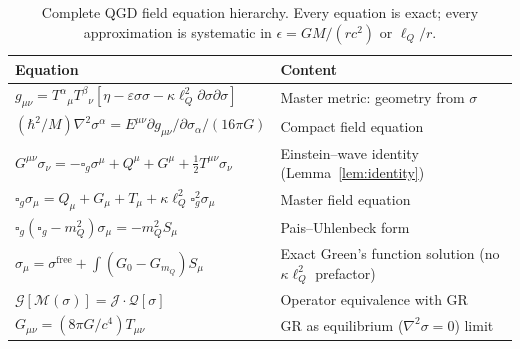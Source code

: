 \documentclass[11pt,a4paper]{article}
\theoremstyle{plain}
\theoremstyle{definition}
\theoremstyle{remark}
\newcommand{\lQ}{\ell_Q}
\newcommand{\mQ}{m_Q}
\newcommand{\boxg}{\square_g}
\newcommand{\half}{\tfrac{1}{2}}
\begin{document}
\begin{table}[h]
\centering
\renewcommand{\arraystretch}{1.5}
\begin{tabular}{@{}p{6.5cm}p{6.5cm}@{}}
\toprule
Equation & Content \\
\midrule
$g_{\mu\nu} = T^\alpha{}_\mu T^\beta{}_\nu[\eta - \varepsilon\sigma\sigma - \kappa\lQ^2\partial\sigma\partial\sigma]$ &
  Master metric: geometry from $\sigma$ \\
$(\hbar^2/M)\nabla^2\sigma^\alpha = E^{\mu\nu}\partial g_{\mu\nu}/\partial\sigma_\alpha / (16\pi G)$ &
  Compact field equation \\
$G^{\mu\nu}\sigma_\nu = -\boxg\sigma^\mu + Q^\mu + G^\mu + \half T^{\mu\nu}\sigma_\nu$ &
  Einstein--wave identity (Lemma~\ref{lem:identity}) \\
$\boxg\sigma_\mu = Q_\mu + G_\mu + T_\mu + \kappa\lQ^2\boxg^2\sigma_\mu$ &
  Master field equation \\
$\boxg(\boxg-\mQ^2)\sigma_\mu = -\mQ^2 S_\mu$ &
  Pais--Uhlenbeck form \\
$\sigma_\mu = \sigma^{\mathrm{free}} + \int(G_0-G_{\mQ})S_\mu$ &
  Exact Green's function solution (no $\kappa\lQ^2$ prefactor) \\
$\mathcal{G}[\mathcal{M}(\sigma)] = \mathcal{J}\cdot\mathcal{Q}[\sigma]$ &
  Operator equivalence with GR \\
$G_{\mu\nu} = (8\pi G/c^4)T_{\mu\nu}$ &
  GR as equilibrium ($\nabla^2\sigma = 0$) limit \\
\bottomrule
\end{tabular}
\caption{Complete QGD field equation hierarchy.  Every equation is exact;
every approximation is systematic in $\epsilon = GM/(rc^2)$ or $\lQ/r$.}
\end{table}
\end{document}
